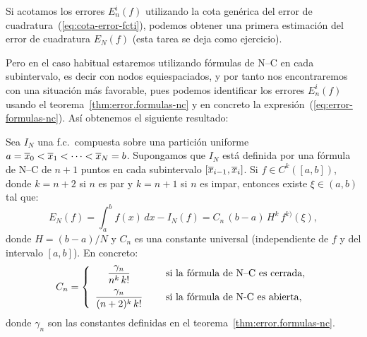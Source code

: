 Si acotamos los errores $E_n^i(f)$ utilizando la cota genérica del
error de cuadratura~(\ref{eq:cota-error-fcti}), podemos obtener una
primera estimación del error de cuadratura $E_N(f)$ (esta tarea se
deja como ejercicio).

Pero en el caso habitual estaremos utilizando fórmulas de N--C en cada
subintervalo, es decir con nodos equiespaciados, y por tanto nos
encontraremos con una situación más favorable, pues podemos
identificar los errores $E_n^i(f)$ usando el
teorema~\ref{thm:error.formulas-nc} y en concreto la
expresión~(\ref{eq:error-formulas-nc}). Así obtenemos el siguiente
resultado:

\begin{theorem}
  \label{thm:error.fc.comp-nc}
  Sea $I_N$ una f.c.\ compuesta sobre una partición uniforme
  $a=\overline x_0<\overline x_1<\dots<\overline x_N=b$. Supongamos que $I_N$ está definida por una
  fórmula de N--C de $n+1$ puntos en cada subintervalo
  $[\overline x_{i-1},\overline x_i]$.  Si $f\in C^k([a,b])$, donde $k=n+2$ si $n$ es par
  y $k=n+1$ si $n$ es impar, entonces existe $\xi\in(a,b)$ tal que:
  \begin{equation}
    \label{eq:error.fc.comp-nc}
    E_N(f)= \int_a^bf(x)\,dx - I_N(f)
    = C_n \, (b-a) \, H^{k} \, f^{k)}(\xi),
  \end{equation}
  donde $H=(b-a)/N$ y $C_n$ es una constante universal (independiente
  de $f$ y del intervalo $[a,b]$). En concreto:
  \begin{equation*}
  C_n=\left\{
    \begin{array}{cl}
      \displaystyle\frac{\gamma_n}{n^k\,k!} & \quad \text{ si la fórmula de N--C es
        cerrada},
      \\ \noalign{\medskip}
      \displaystyle\displaystyle\frac{\gamma_n}{(n+2)^k\,k!} &\quad \text{ si la fórmula
        de N-C es abierta},
    \end{array}
  \right.
\end{equation*}
  donde $\gamma_n$ son las constantes definidas en el
  teorema~\ref{thm:error.formulas-nc}.
\end{theorem}

